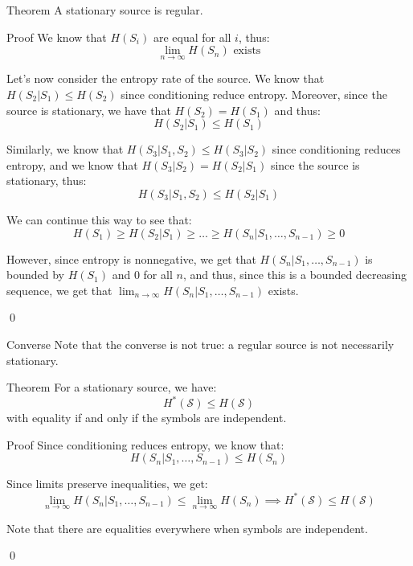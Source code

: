 \documentclass[a4paper]{article}
\begin{document}
\begin{parag}{Theorem}
    A stationary source is regular.

    \begin{subparag}{Proof}
        We know that $H\left(S_i\right)$ are equal for all $i$, thus: 
        \[\lim_{n \to \infty} H\left(S_n\right) \text{ exists}\]
        
        Let's now consider the entropy rate of the source. We know that $H\left(S_2 | S_1\right) \leq H\left(S_2\right)$ since conditioning reduce entropy. Moreover, since the source is stationary, we have that $H\left(S_2\right) = H\left(S_1\right)$ and thus: 
        \[H\left(S_2 | S_1\right) \leq H\left(S_1\right)\]

        Similarly, we know that $H\left(S_3 | S_1, S_2\right) \leq H\left(S_3 | S_2\right)$ since conditioning reduces entropy, and we know that $H\left(S_3 | S_2\right) = H\left(S_2 | S_1\right)$ since the source is stationary, thus: 
        \[H\left(S_3 | S_1, S_2\right) \leq H\left(S_2 | S_1\right)\]
        
        We can continue this way to see that: 
        \[H\left(S_1\right) \geq H\left(S_{2} | S_1\right) \geq \ldots \geq H\left(S_n | S_1, \ldots, S_{n-1}\right) \geq 0\]
        
        However, since entropy is nonnegative, we get that $H\left(S_n | S_1, \ldots, S_{n-1}\right)$ is bounded by $H\left(S_1\right)$ and 0 for all $n$, and thus, since this is a bounded decreasing sequence, we get that $\lim_{n \to \infty} H\left(S_n | S_1, \ldots, S_{n-1}\right)$ exists.

        \qed
    \end{subparag}

    \begin{subparag}{Converse}
        Note that the converse is not true: a regular source is not necessarily stationary.
    \end{subparag}
\end{parag}

\begin{parag}{Theorem}
    For a stationary source, we have:
    \[H^*\left(\mathcal{S}\right) \leq H\left(\mathcal{S}\right)\]
    with equality if and only if the symbols are independent.

    \begin{subparag}{Proof}
        Since conditioning reduces entropy, we know that: 
        \[H\left(S_n |S_1, \ldots, S_{n-1}\right) \leq H\left(S_n\right)\]

        Since limits preserve inequalities, we get: 
        \[\lim_{n \to \infty} H\left(S_n |S_1, \ldots, S_{n-1}\right) \leq \lim_{n \to \infty}  H\left(S_n\right) \implies H^*\left(\mathcal{S}\right) \leq H\left(\mathcal{S}\right)\]

        Note that there are equalities everywhere when symbols are independent.

        \qed
    \end{subparag}
\end{parag}
\end{document}

